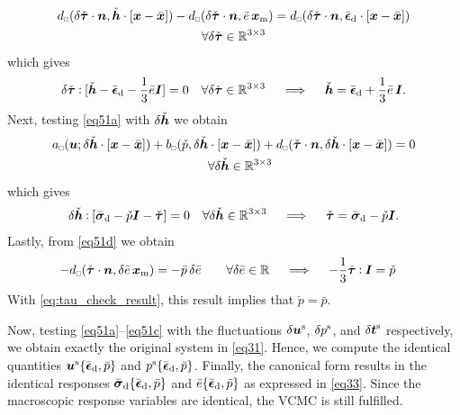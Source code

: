 \documentclass{bmcart}
\newcommand{\eqtrefrange}[2]{\eqref{#1}--\eqref{#2}}
\newcommand{\eqtref}[1]{\eqref{#1}}
\renewcommand{\dev}{\mathrm{d}}
\newcommand{\epspargs}{\{{\bar{\ts\epsilon}}_\dev, \bar{p}\}}
\newcommand{\rve}{
  {\mathchoice
   {\mbox{\scalebox{0.67}{$\Box$}}}
   {\mbox{\scalebox{0.67}{$\Box$}}}
   {\mbox{\scalebox{0.5}{$\Box$}}}
   {\mbox{\scalebox{0.375}{$\Box$}}}
  }
}
\begin{document}
\begin{multline}
    d_\rve(\delta\check{\ts\tau}\cdot\ta{n},\check{\ts h}\cdot[\ta x - \bar{\ta x}]) - d_\rve(\delta\check{\ts\tau}\cdot\ta{n},\bar{e}\,\ta{x}_\mean) = d_\rve(\delta\check{\ts\tau}\cdot\ta{n},\bar{\ts\epsilon}_\dev \cdot[\ta{x}-\bar{\ta{x}}])
\\
    \forall \delta\check{\ts\tau} \in \set{R}^{3\times 3}
\end{multline}
which gives
\begin{gather}
    \delta\check{\ts\tau}\dprod[\check{\ts h} - \bar{\ts\epsilon}_\dev - \frac13\bar{e}\ts I] = 0 \quad \forall \delta\check{\ts\tau} \in \set{R}^{3\times 3}
\quad\implies\quad
\check{\ts h} = \bar{\ts\epsilon}_\dev + \frac13 \bar{e}\,\ts I.
\end{gather}
Next, testing \eqtref{eq51a} with $\delta\check{\boldsymbol{h}}$ we obtain
\begin{multline}
    a_\rve(\ta{u};\delta\check{\ts h}\cdot[\ta x - \bar{\ta x}]) + 
    b_\rve(\check{p},\delta\check{\ts h}\cdot[\ta x - \bar{\ta x}]) + 
    d_\rve(\check{\ts \tau}\cdot\ta n,\delta\check{\ts h}\cdot[\ta x - \bar{\ta x}]) = 0
\\
    \quad \forall \delta\check{\ts h} \in \set R^{3\times 3}
\end{multline}
which gives
\begin{gather}
    \delta\check{\ts h} \dprod[\bar{\ts\sigma}_\dev - \check{p} \ts I - \check{\ts\tau}] = 0
    \quad \forall \delta\check{\ts h} \in \set R^{3\times 3}
\quad\implies\quad
\check{\ts\tau} = \bar{\ts\sigma}_\dev - \check{p} \ts I.
\label{eq:tau_check_result}
\end{gather}
Lastly, from \eqtref{eq51d} we obtain
\begin{alignat}{2}
    - d_\rve(\check{\ts\tau}\cdot\ta n,\delta\bar{e}\,\ta{x}_\mean) &=
    - \bar{p}\,\delta\bar{e}
    &\quad& \forall \delta\bar{e} \in \set{R}
\quad\implies\quad
    -\frac13 \check{\ts\tau}\dprod\ts I = \check{p}
\end{alignat}
With \eqtref{eq:tau_check_result}, this result implies that $\check{p} = \bar{p}$.

Now, testing \eqtrefrange{eq51a}{eq51c} with the fluctuations $\delta\boldsymbol{u}^{\mathrm{s}}$, $\delta p^{\mathrm{s}}$, and $\delta\boldsymbol{t}^{\mathrm{s}}$ respectively, we obtain exactly the original system in \eqtref{eq31}.
Hence, we compute the identical quantities $\ta u^\fluct\{\bar{\ts\epsilon}_\dev, \bar{p}\}$ and $p^\fluct\{\bar{\ts\epsilon}_\dev, \bar{p}\}$.
Finally, the canonical form results in the identical responses $\bar{\ts\sigma}_\dev\epspargs$ and $\bar{e}\epspargs$ as expressed in \eqtref{eq33}.
Since the macroscopic response variables are identical, the VCMC is still fulfilled.
\end{document}
